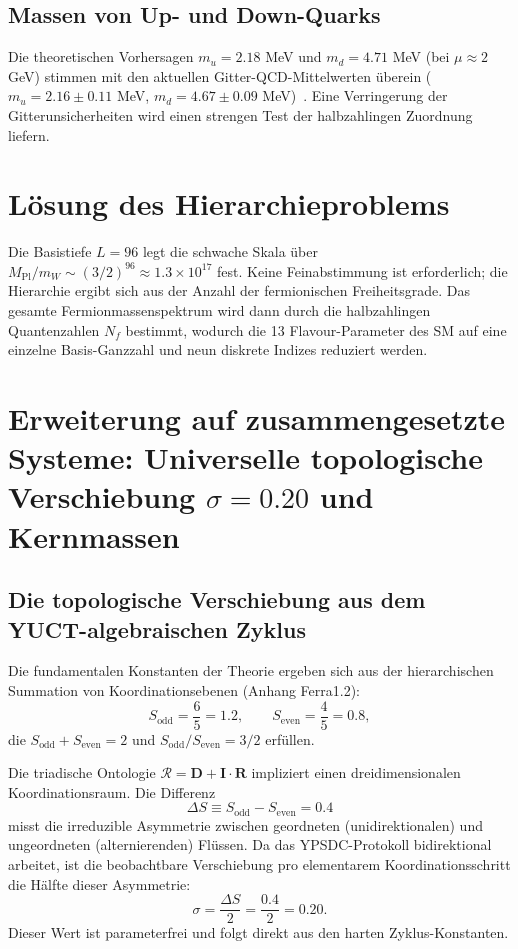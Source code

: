 \documentclass[12pt,a4paper]{article}
\begin{document}
	\subsection{Massen von Up- und Down-Quarks}
	
	Die theoretischen Vorhersagen $m_u = 2.18$ MeV und $m_d = 4.71$ MeV (bei $\mu \approx 2$ GeV) stimmen mit den aktuellen Gitter-QCD-Mittelwerten überein ($m_u = 2.16 \pm 0.11$ MeV, $m_d = 4.67 \pm 0.09$ MeV)~\cite{PDG2024}. Eine Verringerung der Gitterunsicherheiten wird einen strengen Test der halbzahlingen Zuordnung liefern.
	
	\section{Lösung des Hierarchieproblems}
	
	Die Basistiefe $L=96$ legt die schwache Skala über $M_{\mathrm{Pl}}/m_W \sim (3/2)^{96} \approx 1.3\times10^{17}$ fest. Keine Feinabstimmung ist erforderlich; die Hierarchie ergibt sich aus der Anzahl der fermionischen Freiheitsgrade. Das gesamte Fermionmassenspektrum wird dann durch die halbzahlingen Quantenzahlen $N_f$ bestimmt, wodurch die 13 Flavour-Parameter des SM auf eine einzelne Basis-Ganzzahl und neun diskrete Indizes reduziert werden.
	
	\section{Erweiterung auf zusammengesetzte Systeme: Universelle topologische Verschiebung \(\sigma=0.20\) und Kernmassen}
	\label{sec:sigma_nuclear}
	
	\subsection{Die topologische Verschiebung aus dem YUCT-algebraischen Zyklus}
	
	Die fundamentalen Konstanten der Theorie ergeben sich aus der hierarchischen Summation von Koordinationsebenen (Anhang Ferra1.2):
	\[
	S_{\mathrm{odd}} = \frac{6}{5}=1.2,\qquad S_{\mathrm{even}} = \frac{4}{5}=0.8,
	\]
	die \(S_{\mathrm{odd}}+S_{\mathrm{even}}=2\) und \(S_{\mathrm{odd}}/S_{\mathrm{even}}=3/2\) erfüllen.
	
	Die triadische Ontologie \(\mathcal{R} = \mathbf{D} + \mathbf{I}\!\cdot\!\mathbf{R}\) impliziert einen dreidimensionalen Koordinationsraum. Die Differenz
	\[
	\Delta S \equiv S_{\mathrm{odd}} - S_{\mathrm{even}} = 0.4
	\]
	misst die irreduzible Asymmetrie zwischen geordneten (unidirektionalen) und ungeordneten (alternierenden) Flüssen. Da das YPSDC-Protokoll bidirektional arbeitet, ist die beobachtbare Verschiebung pro elementarem Koordinationsschritt die Hälfte dieser Asymmetrie:
	\begin{equation}
		\boxed{\sigma = \frac{\Delta S}{2} = \frac{0.4}{2} = 0.20.}
		\label{eq:sigma_fermion_paper}
	\end{equation}
	Dieser Wert ist parameterfrei und folgt direkt aus den harten Zyklus-Konstanten.
	
\end{document}
